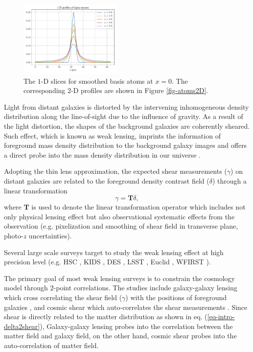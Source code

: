 \documentclass[twocolumn]{aastex62}
\begin{document}
\begin{figure}
 \includegraphics[width=0.45\textwidth]{nfwlet-atom-1D.pdf}
 \caption{The $1$-D slices for smoothed basis atoms at $x=0$. The corresponding $2$-D profiles are shown in Figure 
            \ref{fig-atoms2D}.}
\end{figure}

Light from distant galaxies is distorted by the intervening inhomogeneous density distribution along the line-of-sight
due to the influence of gravity. As a result of the light distortion, the shapes of the background galaxies are coherently
sheared. Such effect, which is known as weak lensing, imprints the information of foreground mass density distribution
to the background galaxy images and offers a direct probe into the mass density distribution in our universe
\citep[see][for recent reviews]{revKilbinger15,revRachel17}.

Adopting the thin lens approximation, the expected shear measurements ($\gamma$) on distant galaxies are related to the 
foreground density contrast field ($\delta$) through a linear transformation
\begin{equation} \label{eq-intro-delta2shear}
 \gamma=\mathbf{T} \delta,
\end{equation}
where $\mathbf{T}$ is used to denote the linear transformation operator which includes not only physical lensing effect
but also observational systematic effects from the observation (e.g. pixelization and smoothing of shear field in
transverse plane, photo-$z$ uncertainties).

Several large scale surveys target to study the weak lensing effect at high precision level (e.g. HSC \citep{HSC1-data}, KIDS
\citep{KIDS13}, DES \citep{DES05}, LSST \citep{LSSTScienceBook}, Euclid \citep{Euclid2011}, WFIRST \citep{WFIRST15}).

The primary goal of most weak lensing surveys is to constrain the cosmology model through $2$-point correlations. The studies
include galaxy-galaxy lensing which cross correlating the shear field ($\gamma$) with the positions of foreground galaxies
\citep{gglens-GAMA-Han2014,gglens-BossCFHTMore2015,gglens-DES1},
and cosmic shear which auto-correlates the shear measurements
\citep{cosmicShearRealKids450,cosmicShear-DES1,cosmicShear_HSC1_Chiaki2019,cosmicShear_HSC1_Hamana2019}.
Since shear is directly related to the matter distribution as shown in eq. (\ref{eq-intro-delta2shear}), Galaxy-galaxy lensing
probes into the correlation between the matter field and galaxy field, on the other hand, cosmic shear probes into the
auto-correlation of matter field.
\end{document}
